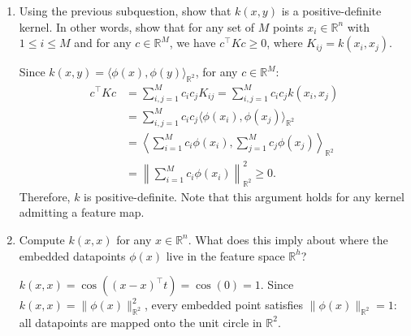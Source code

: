 \begin{enumerate}
    \textit{Hint:} Recall the trigonometric identity $\cos(a-b)=\cos(a)\cos(b) +\sin(a)\sin(b)$.
    \begin{solutionbox}{4.5cm}
    Using the hint with $a = x^\top t$ and $b = y^\top t$:
    \begin{align*}
    k(x,y) &= \cos(x^\top t)\cos(y^\top t) + \sin(x^\top t)\sin(y^\top t) = \langle \phi(x), \phi(y) \rangle_{\mathbb{R}^2}, \\
    &\quad \text{with } \phi(x) = \begin{bmatrix} \cos(x^\top t) \\ \sin(x^\top t) \end{bmatrix} \in \mathbb{R}^2.
    \end{align*}
    Therefore, $h = 2$.
    \end{solutionbox}
    \item Using the previous subquestion, show that $k(x,y)$ is a positive-definite kernel. In other words, show that for any set of $M$ points $x_i \in \mathbb{R}^n$ with $1\leqslant i \leqslant M$ and for any $c \in \mathbb{R}^M$, we have $c^\top K c \geqslant 0$, where $K_{ij} = k(x_i,x_j)$.
    \begin{solutionbox}{9cm}
    Since $k(x,y) = \langle \phi(x), \phi(y) \rangle_{\mathbb{R}^2}$, for any $c \in \mathbb{R}^M$:
    \begin{align*}
    c^\top K c &= \sum_{i,j=1}^M c_i c_j K_{ij} = \sum_{i,j=1}^M c_i c_j k(x_i, x_j) \\
    &= \sum_{i,j=1}^M c_i c_j \langle \phi(x_i), \phi(x_j) \rangle_{\mathbb{R}^2} \\
    &= \left\langle \sum_{i=1}^M c_i \phi(x_i), \sum_{j=1}^M c_j \phi(x_j) \right\rangle_{\mathbb{R}^2} \\
    &= \left\| \sum_{i=1}^M c_i \phi(x_i) \right\|_{\mathbb{R}^2}^2 \geq 0.
    \end{align*}
    Therefore, $k$ is positive-definite. Note that this argument holds for any kernel admitting a feature map.
    \end{solutionbox}
    \item Compute $k(x,x)$ for any $x \in \mathbb{R}^n$. What does this imply about where the embedded datapoints $\phi(x)$ live in the feature space $\mathbb{R}^h$?
    \begin{solutionbox}{8cm}
    $k(x,x) = \cos((x-x)^\top t) = \cos(0) = 1$. Since $k(x,x) = \|\phi(x)\|_{\mathbb{R}^2}^2$, every embedded point satisfies $\|\phi(x)\|_{\mathbb{R}^2} = 1$: all datapoints are mapped onto the unit circle in $\mathbb{R}^2$.

\end{solutionbox}
\end{enumerate}

